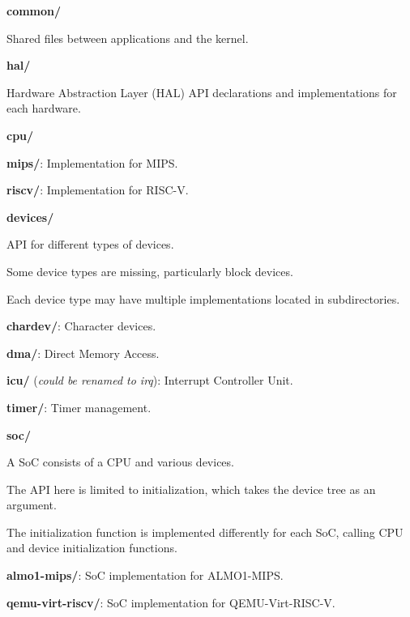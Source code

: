 \begin{DoxyItemize}
\item {\bfseries common/}\par
 Shared files between applications and the kernel.
\item {\bfseries hal/}\par
 Hardware Abstraction Layer (H\-A\-L) A\-P\-I declarations and implementations for each hardware.
\begin{DoxyItemize}
\item {\bfseries cpu/}
\begin{DoxyItemize}
\item {\bfseries mips/}\-: Implementation for M\-I\-P\-S.
\item {\bfseries riscv/}\-: Implementation for R\-I\-S\-C-\/\-V.
\end{DoxyItemize}
\item {\bfseries devices/}\par
 A\-P\-I for different types of devices.\par
 Some device types are missing, particularly block devices.\par
 Each device type may have multiple implementations located in subdirectories.
\begin{DoxyItemize}
\item {\bfseries chardev/}\-: Character devices.
\item {\bfseries dma/}\-: Direct Memory Access.
\item {\bfseries icu/} ({\itshape could be renamed to irq})\-: Interrupt Controller Unit.
\item {\bfseries timer/}\-: Timer management.
\end{DoxyItemize}
\item {\bfseries soc/}\par
 A So\-C consists of a C\-P\-U and various devices.\par
 The A\-P\-I here is limited to initialization, which takes the device tree as an argument.\par
 The initialization function is implemented differently for each So\-C, calling C\-P\-U and device initialization functions.
\begin{DoxyItemize}
\item {\bfseries almo1-\/mips/}\-: So\-C implementation for A\-L\-M\-O1-\/\-M\-I\-P\-S.
\item {\bfseries qemu-\/virt-\/riscv/}\-: So\-C implementation for Q\-E\-M\-U-\/\-Virt-\/\-R\-I\-S\-C-\/\-V.
\end{DoxyItemize}

\end{DoxyItemize}
\end{DoxyItemize}

